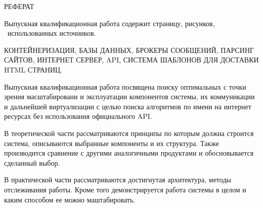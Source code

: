 \begin{center}
РЕФЕРАТ
\end{center}









Выпускная квалификационная работа содержит \pageref{LastPage} страницу, \totfig{}
рисунков, \ использованных источников.

КОНТЕЙНЕРИЗАЦИЯ, БАЗЫ ДАННЫХ, БРОКЕРЫ СООБЩЕНИЙ, ПАРСИНГ САЙТОВ, ИНТЕРНЕТ
СЕРВЕР, API, СИСТЕМА ШАБЛОНОВ ДЛЯ ДОСТАВКИ HTML СТРАНИЦ.

Выпускная квалификационная работа посвящена поиску оптимальных с точки зрения
масштабировани и эксплуатации компонентов системы, их коммуникации и дальнейшей
виртуализации с целью поиска алгоритмов по имени на интернет ресурсах без
использования официального API.

В теоретической части рассматриваются принципы по которым должна строится
система, описываются выбранные компоненты и их структура. Также производится
сравнение с другими аналогичными продуктами и обосновывается сделанный выбор.

В практической части рассматриваются достигнутая архитектура, методы
отслеживания работы. Кроме того демонстрируется работа системы в целом и каким
способом ее можно маштабировать.
